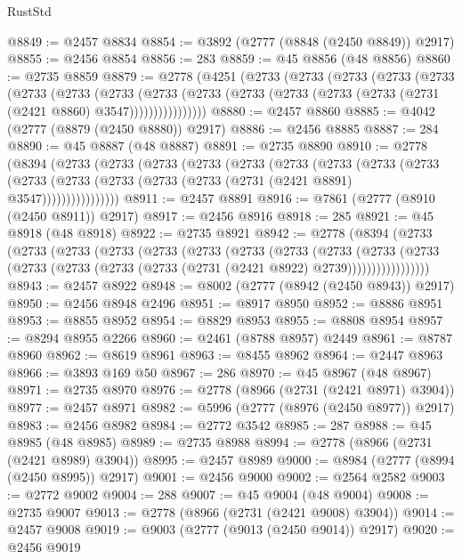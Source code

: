 \begin{lexlean}{RustStd}
\begin{coremodule}
@8849 := @2457 @8834
@8854 := @3892 (@2777 (@8848 (@2450 @8849)) @2917)
@8855 := @2456 @8854
@8856 := 283
@8859 := @45 @8856 (@48 @8856)
@8860 := @2735 @8859
@8879 := @2778
    (@4251
      (@2733
        (@2733
          (@2733
            (@2733
              (@2733
                (@2733
                  (@2733
                    (@2733
                      (@2733
                        (@2733
                          (@2733 (@2733 (@2733 (@2733 (@2731 (@2421 @8860) @3547))))))))))))))))
@8880 := @2457 @8860
@8885 := @4042 (@2777 (@8879 (@2450 @8880)) @2917)
@8886 := @2456 @8885
@8887 := 284
@8890 := @45 @8887 (@48 @8887)
@8891 := @2735 @8890
@8910 := @2778
    (@8394
      (@2733
        (@2733
          (@2733
            (@2733
              (@2733
                (@2733
                  (@2733
                    (@2733
                      (@2733
                        (@2733
                          (@2733 (@2733 (@2733 (@2733 (@2731 (@2421 @8891) @3547))))))))))))))))
@8911 := @2457 @8891
@8916 := @7861 (@2777 (@8910 (@2450 @8911)) @2917)
@8917 := @2456 @8916
@8918 := 285
@8921 := @45 @8918 (@48 @8918)
@8922 := @2735 @8921
@8942 := @2778
    (@8394
      (@2733
        (@2733
          (@2733
            (@2733
              (@2733
                (@2733
                  (@2733
                    (@2733
                      (@2733
                        (@2733
                          (@2733
                            (@2733 (@2733 (@2733 (@2733 (@2731 (@2421 @8922) @2739)))))))))))))))))
@8943 := @2457 @8922
@8948 := @8002 (@2777 (@8942 (@2450 @8943)) @2917)
@8950 := @2456 @8948 @2496
@8951 := @8917 @8950
@8952 := @8886 @8951
@8953 := @8855 @8952
@8954 := @8829 @8953
@8955 := @8808 @8954
@8957 := @8294 @8955 @2266
@8960 := @2461 (@8788 @8957) @2449
@8961 := @8787 @8960
@8962 := @8619 @8961
@8963 := @8455 @8962
@8964 := @2447 @8963
@8966 := @3893 @169 @50
@8967 := 286
@8970 := @45 @8967 (@48 @8967)
@8971 := @2735 @8970
@8976 := @2778 (@8966 (@2731 (@2421 @8971) @3904))
@8977 := @2457 @8971
@8982 := @5996 (@2777 (@8976 (@2450 @8977)) @2917)
@8983 := @2456 @8982
@8984 := @2772 @3542
@8985 := 287
@8988 := @45 @8985 (@48 @8985)
@8989 := @2735 @8988
@8994 := @2778 (@8966 (@2731 (@2421 @8989) @3904))
@8995 := @2457 @8989
@9000 := @8984 (@2777 (@8994 (@2450 @8995)) @2917)
@9001 := @2456 @9000
@9002 := @2564 @2582
@9003 := @2772 @9002
@9004 := 288
@9007 := @45 @9004 (@48 @9004)
@9008 := @2735 @9007
@9013 := @2778 (@8966 (@2731 (@2421 @9008) @3904))
@9014 := @2457 @9008
@9019 := @9003 (@2777 (@9013 (@2450 @9014)) @2917)
@9020 := @2456 @9019

\end{coremodule}
\end{lexlean}
